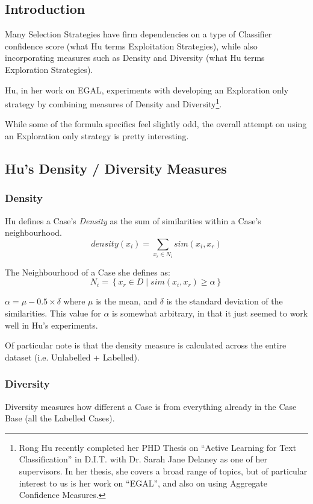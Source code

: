 \documentclass[a4paper,11pt]{report}
\begin{document}
\subsection{Introduction}
Many Selection Strategies have firm dependencies on a type of Classifier confidence score (what Hu terms Exploitation Strategies), while also incorporating measures such as Density and Diversity (what Hu terms Exploration Strategies).

Hu, in her work on EGAL, experiments with developing an Exploration only strategy by combining measures of Density and Diversity\footnote{Rong Hu recently completed her PHD Thesis on ``Active Learning for Text Classification'' in D.I.T. with Dr. Sarah Jane Delaney as one of her supervisors\citep{Hu2011}. In her thesis, she covers a broad range of topics, but of particular interest to us is her work on ``EGAL'', and also on using Aggregate Confidence Measures.}.

While some of the formula specifics feel slightly odd, the overall attempt on using an Exploration only strategy is pretty interesting. 

\subsection{Hu's Density / Diversity Measures}

\subsubsection{Density}
Hu defines a Case's \emph{Density} as the sum of similarities within a Case's neighbourhood.
\[
density(x_{i})=\underset{x_{r}\in N_{i}}{\sum}sim(x_{i},x_{r})
\]

The Neighbourhood of a Case she defines as:
\[
N_{i}=\left\{ x_{r}\in D\mid sim(x_{i},x_{r})\geq\alpha\right\} 
\]

$\alpha=\mu-0.5\times\delta$ where $\mu$ is the mean, and $\delta$ is the standard deviation of the similarities. This value for $\alpha$ is somewhat arbitrary, in that it just seemed to work well in Hu's experiments.

Of particular note is that the density measure is calculated across the entire dataset (i.e. Unlabelled + Labelled). 

\subsubsection{Diversity}

Diversity measures how different a Case is from everything already in the Case Base (all the Labelled Cases).
\end{document}
